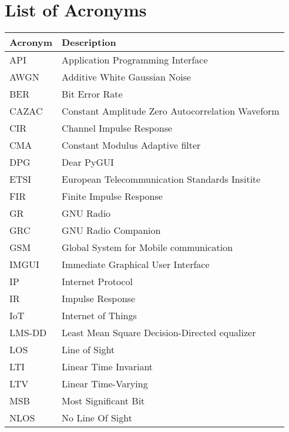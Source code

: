 \documentclass[
	overfullrule,
	paper = a4, twoside, openright, BCOR = 5mm,
	headinclude, footexclude,
	fontsize = 11pt,
	cleardoublepage = empty,
	titlepage, abstract = on,
	automark,
]{scrreprt}
\begin{document}
	\chapter*{List of Acronyms}
	\noindent
	\begin{tabularx}{\linewidth}{l X}
		\toprule
		\bfseries Acronym & \bfseries Description \\
		\midrule
		API    & Application Programming Interface                \\
		AWGN   & Additive White Gaussian Noise                    \\
		BER    & Bit Error Rate                                   \\
		CAZAC  & Constant Amplitude Zero Autocorrelation Waveform \\
		CIR    & Channel Impulse Response                         \\
		CMA    & Constant Modulus Adaptive filter                 \\
		DPG    & Dear PyGUI                                       \\
		ETSI   & European Telecommunication Standards Insitite    \\
		FIR    & Finite Impulse Response                          \\
		GR     & GNU Radio                                        \\
		GRC    & GNU Radio Companion                              \\
		GSM    & Global System for Mobile communication           \\
		IMGUI  & Immediate Graphical User Interface               \\
		IP     & Internet Protocol                                \\
		IR     & Impulse Response                                 \\
		IoT    & Internet of Things                               \\
		LMS-DD & Least Mean Square Decision-Directed equalizer    \\
		LOS    & Line of Sight                                    \\
		LTI    & Linear Time Invariant                            \\
		LTV    & Linear Time-Varying                              \\
		MSB    & Most Significant Bit                             \\
		NLOS   & No Line Of Sight                                 \\

\end{tabularx}
\end{document}
